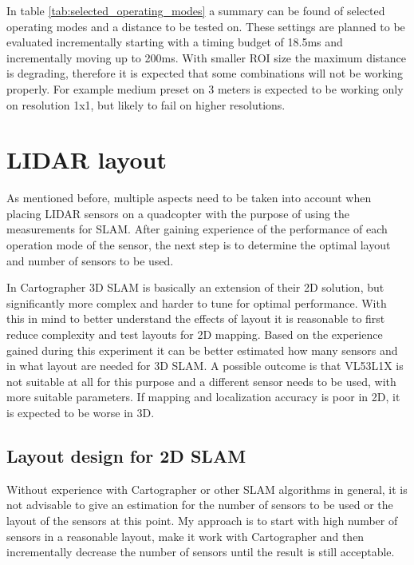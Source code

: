 In table \ref{tab:selected_operating_modes} a summary can be found of selected operating modes and a 
distance to be tested on. These settings are planned to be evaluated incrementally starting with a 
timing budget of 18.5ms and incrementally moving up to 200ms. With smaller ROI size the maximum 
distance is degrading, therefore it is expected that some combinations will not be working 
properly. For example medium preset on 3 meters is expected to be working only on resolution 1x1, 
but likely to fail on higher resolutions.








\section{LIDAR layout} \label{sect:lidar_layout_plan}
As mentioned before, multiple aspects need to be taken into account when placing LIDAR sensors on a
quadcopter with the purpose of using the measurements for SLAM. After gaining experience of the performance
of each operation mode of the sensor, the next step is to determine the optimal layout and number of sensors 
to be used. 

In Cartographer 3D SLAM is basically an extension of their 2D solution, but significantly more complex and 
harder to tune for optimal performance. With this in mind to better understand the effects of
layout it is reasonable to first reduce complexity and test layouts for 2D mapping. Based on 
the experience gained during this experiment it can be better estimated how many sensors and in what layout
are needed for 3D SLAM. A possible outcome is that VL53L1X is not suitable at all for this purpose and
a different sensor needs to be used, with more suitable parameters. If mapping and localization accuracy 
is poor in 2D, it is expected to be worse in 3D.

\subsection{Layout design for 2D SLAM}
Without experience with Cartographer or other SLAM algorithms in general, it is not advisable to give an 
estimation for the number of sensors to be used or the layout of the sensors at this point. My approach 
is to start with high number of sensors in a reasonable layout, make it work with Cartographer and then
incrementally decrease the number of sensors until the result is still acceptable.

